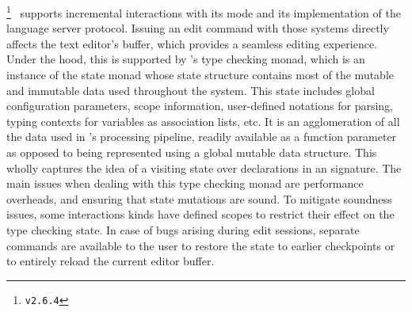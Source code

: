 \Agda\footnote{\Agda \texttt{v2.6.4}}~\cite{clffolp, norell2007towards, agda2023} supports incremental interactions with its \Agda mode and its implementation of the language server protocol.
Issuing an edit command with those systems directly affects the text editor's buffer, which provides a seamless editing experience.
Under the hood, this is supported by \Agda's type checking monad, which is an instance of the state monad whose state structure contains most of the mutable and immutable data used throughout the system.
This state includes global configuration parameters, scope information, user-defined notations for parsing, typing contexts for variables as association lists, etc.
It is an agglomeration of all the data used in \Agda's processing pipeline, readily available as a function parameter as opposed to being represented using a global mutable data structure.
This wholly captures the idea of a visiting state over declarations in an \Agda signature.
The main issues when dealing with this type checking monad are performance overheads, and ensuring that state mutations are sound.
To mitigate soundness issues, some interactions kinds have defined scopes to restrict their effect on the type checking state.
In case of bugs arising during edit sessions, separate commands are available to the user to restore the state to earlier checkpoints or to entirely reload the current editor buffer.




